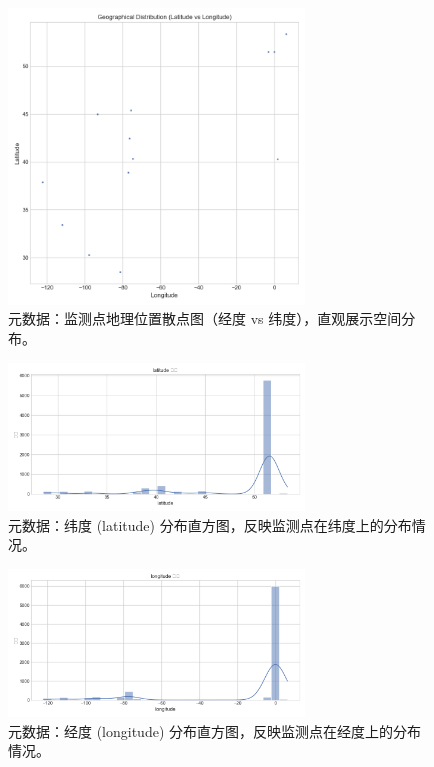 \documentclass{article} %
\begin{document}
\begin{figure}[H]
    \centering
    \includegraphics[width=0.7\textwidth]{../plots/metadata_location_scatter.png}
    \caption{元数据：监测点地理位置散点图（经度 vs 纬度），直观展示空间分布。} %
    \label{fig:metadata_location_scatter}
\end{figure}

\begin{figure}[H]
    \centering
    \includegraphics[width=0.7\textwidth]{../plots/metadata_hist_latitude.png}
    \caption{元数据：纬度 (latitude) 分布直方图，反映监测点在纬度上的分布情况。} %
    \label{fig:metadata_hist_latitude}
\end{figure}

\begin{figure}[H]
    \centering
    \includegraphics[width=0.7\textwidth]{../plots/metadata_hist_longitude.png}
    \caption{元数据：经度 (longitude) 分布直方图，反映监测点在经度上的分布情况。} %
    \label{fig:metadata_hist_longitude}
\end{figure}
\end{document}
